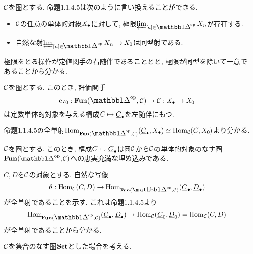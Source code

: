 \documentclass[uplatex, a4paper, 14Q, dvipdfmx]{jsreport}
\begin{document}
\begin{remark}
  $\mathcal{C}$を圏とする. 
  命題1.1.4.5は次のように言い換えることができる. 
  \begin{itemize}
    \item $\mathcal{C}$の任意の単体的対象$X_\bullet$に対して, 極限$\varprojlim_{[n] \in \simop} X_n$が存在する. 
    \item 自然な射$\varprojlim_{[n] \in \simop} X_n \to X_0$は同型射である. 
  \end{itemize}
\end{remark}

\begin{Proof}
  極限をとる操作が定値関手の右随伴であることとと, 極限が同型を除いて一意であることから分かる. 
\end{Proof}

\begin{cor}
  $\mathcal{C}$を圏とする. 
  このとき, 評価関手
  \begin{align*}
    \eva_0: \fun(\simop, \calC) \to \calC: \X \to X_0
  \end{align*}
  は定数単体的対象を与える構成$C \mt \uline{C}_\bullet$を左随伴にもつ. 
\end{cor}

\begin{Proof}
  命題1.1.4.5の全単射$\Hom_{\fun(\simop,\calC)}(\uline{C}_{\bullet},X_{\bullet}) \simeq \Hom_{\calC}(C,X_0)$より分かる. 
\end{Proof}

\begin{cor}
  $\mathcal{C}$を圏とする. 
  このとき, 構成$C \mt \uline{C}_\bullet$は圏$\mathcal{C}$から$\mathcal{C}$の単体的対象のなす圏$\fun(\simop,\calC)$への忠実充満な埋め込みである. 
\end{cor}

\begin{Proof}
  $C,D$を$\mathcal{C}$の対象とする. 
  自然な写像
  \begin{align*}
    \theta: \Hom_\calC(C,D) \to \Hom_{\fun(\simop,\calC)}(\uline{C}_\bullet,\uline{D}_\bullet)
  \end{align*}
  が全単射であることを示す. 
  これは命題1.1.4.5より
  \begin{align*}
    \Hom_{\fun(\simop,\calC)}(\uline{C}_{\bullet},\uline{D}_{\bullet}) \to \Hom_{\calC}(\uline{C}_0,\uline{D}_0) = \Hom_\calC(C,D)
  \end{align*}
  が全単射であることから分かる. 
\end{Proof}

$\mathcal{C}$を集合のなす圏$\mathbf{Set}$とした場合を考える. 
\end{document}
